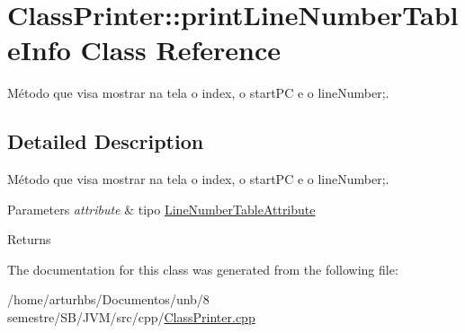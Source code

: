 \hypertarget{classClassPrinter_1_1printLineNumberTableInfo}{}\section{Class\+Printer\+:\+:print\+Line\+Number\+Table\+Info Class Reference}
\label{classClassPrinter_1_1printLineNumberTableInfo}


Método que visa mostrar na tela o index, o start\+PC e o line\+Number;.  




\subsection{Detailed Description}
Método que visa mostrar na tela o index, o start\+PC e o line\+Number;. 


\begin{DoxyParams}{Parameters}
{\em attribute} & tipo \hyperlink{classLineNumberTableAttribute}{Line\+Number\+Table\+Attribute} \\
\hline
\end{DoxyParams}
\begin{DoxyReturn}{Returns}

\end{DoxyReturn}


The documentation for this class was generated from the following file\+:\begin{DoxyCompactItemize}
\item 
/home/arturhbs/\+Documentos/unb/8 semestre/\+S\+B/\+J\+V\+M/src/cpp/\hyperlink{ClassPrinter_8cpp}{Class\+Printer.\+cpp}\end{DoxyCompactItemize}
